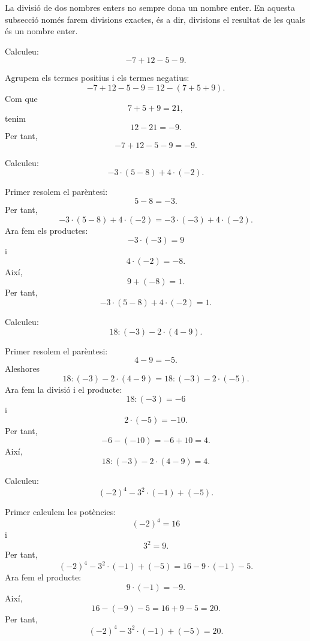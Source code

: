 \begin{observacio}
La divisió de dos nombres enters no sempre dona un nombre enter. En aquesta subsecció només farem divisions exactes, és a dir, divisions el resultat de les quals és un nombre enter.
\end{observacio}

\begin{exercici}
Calculeu:
\[
	-7+12-5-9.
\]
\end{exercici}

\begin{solucio}
Agrupem els termes positius i els termes negatius:
\[
	-7+12-5-9
	=
	12-(7+5+9).
\]
Com que
\[
	7+5+9=21,
\]
tenim
\[
	12-21=-9.
\]
Per tant,
\[
	-7+12-5-9=-9.
\]
\end{solucio}

\begin{exercici}
Calculeu:
\[
	-3\cdot(5-8)+4\cdot(-2).
\]
\end{exercici}

\begin{solucio}
Primer resolem el parèntesi:
\[
	5-8=-3.
\]
Per tant,
\[
	-3\cdot(5-8)+4\cdot(-2)
	=
	-3\cdot(-3)+4\cdot(-2).
\]
Ara fem els productes:
\[
	-3\cdot(-3)=9
\]
i
\[
	4\cdot(-2)=-8.
\]
Així,
\[
	9+(-8)=1.
\]
Per tant,
\[
	-3\cdot(5-8)+4\cdot(-2)=1.
\]
\end{solucio}

\begin{exercici}
Calculeu:
\[
	18:(-3)-2\cdot(4-9).
\]
\end{exercici}

\begin{solucio}
Primer resolem el parèntesi:
\[
	4-9=-5.
\]
Aleshores
\[
	18:(-3)-2\cdot(4-9)
	=
	18:(-3)-2\cdot(-5).
\]
Ara fem la divisió i el producte:
\[
	18:(-3)=-6
\]
i
\[
	2\cdot(-5)=-10.
\]
Per tant,
\[
	-6-(-10)=-6+10=4.
\]
Així,
\[
	18:(-3)-2\cdot(4-9)=4.
\]
\end{solucio}

\begin{exercici}
Calculeu:
\[
	(-2)^4-3^2\cdot(-1)+(-5).
\]
\end{exercici}

\begin{solucio}
Primer calculem les potències:
\[
	(-2)^4=16
\]
i
\[
	3^2=9.
\]
Per tant,
\[
	(-2)^4-3^2\cdot(-1)+(-5)
	=
	16-9\cdot(-1)-5.
\]
Ara fem el producte:
\[
	9\cdot(-1)=-9.
\]
Així,
\[
	16-(-9)-5=16+9-5=20.
\]
Per tant,
\[
	(-2)^4-3^2\cdot(-1)+(-5)=20.
\]
\end{solucio}


